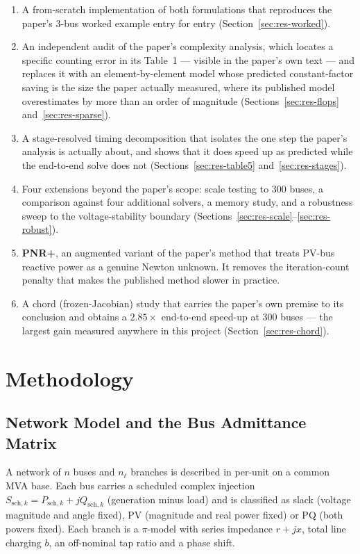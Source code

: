 \documentclass[sigconf,nonacm]{acmart}
\begin{document}
\begin{enumerate}
\item A from-scratch implementation of both formulations that reproduces the
      paper's 3-bus worked example entry for entry
      (Section~\ref{sec:res-worked}).
\item An independent audit of the paper's complexity analysis, which locates a
      specific counting error in its Table~1 --- visible in the paper's own
      text --- and replaces it with an element-by-element model whose predicted
      constant-factor saving is the size the paper actually measured, where its
      published model overestimates by more than an order of magnitude
      (Sections~\ref{sec:res-flops} and~\ref{sec:res-sparse}).
\item A stage-resolved timing decomposition that isolates the one step the
      paper's analysis is actually about, and shows that it does speed up as
      predicted while the end-to-end solve does not
      (Sections~\ref{sec:res-table5} and~\ref{sec:res-stages}).
\item Four extensions beyond the paper's scope: scale testing to 300 buses, a
      comparison against four additional solvers, a memory study, and a
      robustness sweep to the voltage-stability boundary
      (Sections~\ref{sec:res-scale}--\ref{sec:res-robust}).
\item \textbf{PNR+}, an augmented variant of the paper's method that treats
      PV-bus reactive power as a genuine Newton unknown. It removes the
      iteration-count penalty that makes the published method slower in
      practice.
\item A chord (frozen-Jacobian) study that carries the paper's own premise to
      its conclusion and obtains a $2.85\times$ end-to-end speed-up at 300
      buses --- the largest gain measured anywhere in this project
      (Section~\ref{sec:res-chord}).
\end{enumerate}

\section{Methodology}

\subsection{Network Model and the Bus Admittance Matrix}
A network of $n$ buses and $n_\ell$ branches is described in per-unit on a
common MVA base. Each bus carries a scheduled complex injection
$S_{\mathrm{sch},k} = P_{\mathrm{sch},k} + jQ_{\mathrm{sch},k}$ (generation minus
load) and is classified as slack (voltage magnitude and angle fixed), PV
(magnitude and real power fixed) or PQ (both powers fixed). Each branch is a
$\pi$-model with series impedance $r+jx$, total line charging $b$, an
off-nominal tap ratio and a phase shift.
\end{document}
